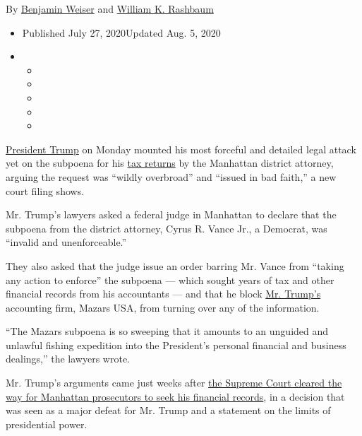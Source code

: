 By \href{https://www.nytimes3xbfgragh.onion/by/benjamin-weiser}{Benjamin
Weiser} and
\href{https://www.nytimes3xbfgragh.onion/by/william-k-rashbaum}{William
K. Rashbaum}

\begin{itemize}
\item
  Published July 27, 2020Updated Aug. 5, 2020
\item
  \begin{itemize}
  \item
  \item
  \item
  \item
  \item
  \end{itemize}
\end{itemize}

\href{https://www.nytimes3xbfgragh.onion/2020/08/05/nyregion/trump-taxes-vance-deutsche-bank.html}{President
Trump} on Monday mounted his most forceful and detailed legal attack yet
on the subpoena for his
\href{https://www.nytimes3xbfgragh.onion/2020/08/05/nyregion/trump-taxes-vance-deutsche-bank.html}{tax
returns} by the Manhattan district attorney, arguing the request was
``wildly overbroad'' and ``issued in bad faith,'' a new court filing
shows.

Mr. Trump's lawyers asked a federal judge in Manhattan to declare that
the subpoena from the district attorney, Cyrus R. Vance Jr., a Democrat,
was ``invalid and unenforceable.''

They also asked that the judge issue an order barring Mr. Vance from
``taking any action to enforce'' the subpoena --- which sought years of
tax and other financial records from his accountants --- and that he
block
\href{https://www.nytimes3xbfgragh.onion/2020/07/28/us/politics/donald-fred-trump.html}{Mr.
Trump's} accounting firm, Mazars USA, from turning over any of the
information.

``The Mazars subpoena is so sweeping that it amounts to an unguided and
unlawful fishing expedition into the President's personal financial and
business dealings,'' the lawyers wrote.

Mr. Trump's arguments came just weeks after
\href{https://www.nytimes3xbfgragh.onion/2020/07/09/us/trump-taxes-supreme-court.html?action=click\&module=RelatedLinks\&pgtype=Article}{the
Supreme Court cleared the way for Manhattan prosecutors to seek his
financial records}, in a decision that was seen as a major defeat for
Mr. Trump and a statement on the limits of presidential power.

